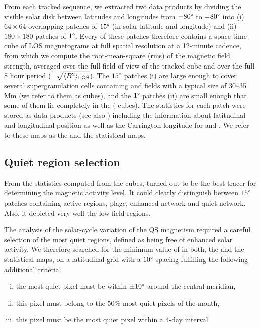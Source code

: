 \documentclass{aa}
\begin{document}
From each tracked sequence, we extracted two data products by dividing the visible solar disk  between latitudes and longitudes from $-80\degree$ to +$80\degree$ into (i) $64\times 64$  overlapping patches of $15\degree$ (in solar latitude and longitude)  and (ii) $180\times 180$ patches of $1\degree$.
Every of these patches therefore contains a space-time cube of LOS magnetograms at full spatial resolution at a 12-minute cadence,
from which we 
compute the 
root-mean-square
(rms) 
of the magnetic field strength, averaged over the full field-of-view of the tracked cube 
and over the full 8 hour period
(\brms{}=$\sqrt{\langle B^2\rangle_{\rm LOS}}$).
The $15\degree$ patches (i) are large enough to cover several supergranulation cells containing \NW{} and \IN{} fields \cite[]{2010LRSP....7....2R} with a typical size of 30--35\,Mm (we refer to them as \nw{} cubes), and the $1\degree$ patches (ii) are small enough that some of them lie completely in the \IN{} (\inw{} cubes). 
The statistics for each patch were stored as data products (see also ) including the information about 
latitudinal and longitudinal position as well as the Carrington 
longitude for \NW{} and \IN{}. We refer to these maps as the \nw{} and the \inw{} statistical maps.

\subsection{Quiet region selection\label{quietregion}}

From the 
statistics computed from the cubes, 
\brms{}
turned out to be the best tracer for determining the magnetic activity level. It could clearly distinguish between $15\degree$ patches containing active regions, plage, enhanced network and quiet network. Also, it depicted very well the low-field \IN{} regions.

The analysis of the solar-cycle variation of the 
QS
magnetism required a careful selection of the most quiet regions, defined as being free of enhanced solar activity. We therefore searched for the minimum value of \brms{} in both, the \nw{} and the \inw{} statistical maps, on a latitudinal grid with a $10\degree$ spacing fulfilling the following additional criteria:
\begin{enumerate}[(i)]
	\item\label{c1} the most quiet pixel must be within $\pm10\degree$ around the central meridian,
	\item\label{c2}  this pixel must belong to the 50\% most quiet pixels of the month,
	\item\label{c3}  this pixel must be the most quiet pixel within a 4-day interval.
\end{enumerate}
\end{document}
